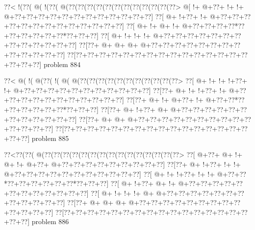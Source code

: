 \vbox{\vbox{\goo
\0??<\- !(\0??(\- @(\- !(\0??(\- @(\0??(\0??(\0??(\0??(\0??(\0??(\0??(\0??(\0??(\0??(\0??(\0??>
\- @[\- !+\- @+\0??+\- !+\- !+\- @+\0??+\0??+\0??+\0??+\0??+\0??+\0??+\0??+\0??+\0??+\0??+\0??]
\0??[\- @+\- !+\0??+\- !+\- @+\0??+\0??+\0??+\0??+\0??+\0??+\0??+\0??+\0??+\0??+\0??+\0??+\0??]
\0??[\- @+\- !+\- @+\- !+\- @+\0??+\0??+\0??+\0??*\0??+\0??+\0??+\0??+\0??+\0??*\0??+\0??+\0??]
\0??[\- @+\- !+\- !+\- !+\- @+\0??+\0??+\0??+\0??+\0??+\0??+\0??+\0??+\0??+\0??+\0??+\0??+\0??]
\0??[\0??+\- @+\- @+\- @+\- @+\0??+\0??+\0??+\0??+\0??+\0??+\0??+\0??+\0??+\0??+\0??+\0??+\0??]
\0??[\0??+\0??+\0??+\0??+\0??+\0??+\0??+\0??+\0??+\0??+\0??+\0??+\0??+\0??+\0??+\0??+\0??+\0??]
}
\hfil problem 884\hfil\break
}



\vbox{\vbox{\goo
\0??<\- @(\- !(\- @(\0??(\- !(\- @(\- @(\0??(\0??(\0??(\0??(\0??(\0??(\0??(\0??(\0??(\0??(\0??>
\0??[\- @+\- !+\- !+\- !+\0??+\- !+\- @+\0??+\0??+\0??+\0??+\0??+\0??+\0??+\0??+\0??+\0??+\0??]
\0??[\0??+\- @+\- !+\- !+\0??+\- !+\- @+\0??+\0??+\0??+\0??+\0??+\0??+\0??+\0??+\0??+\0??+\0??]
\0??[\0??+\- @+\- !+\- @+\0??+\- !+\- @+\0??+\0??*\0??+\0??+\0??+\0??+\0??+\0??*\0??+\0??+\0??]
\0??[\0??+\- @+\- !+\0??+\- @+\- @+\0??+\0??+\0??+\0??+\0??+\0??+\0??+\0??+\0??+\0??+\0??+\0??]
\0??[\0??+\- @+\- @+\- @+\0??+\0??+\0??+\0??+\0??+\0??+\0??+\0??+\0??+\0??+\0??+\0??+\0??+\0??]
\0??[\0??+\0??+\0??+\0??+\0??+\0??+\0??+\0??+\0??+\0??+\0??+\0??+\0??+\0??+\0??+\0??+\0??+\0??]
}
\hfil problem 885\hfil\break
}



\vbox{\vbox{\goo
\0??<\0??(\0??(\- @(\0??(\0??(\0??(\0??(\0??(\0??(\0??(\0??(\0??(\0??(\0??(\0??(\0??(\0??(\0??>
\0??[\- @+\0??+\- @+\- !+\- @+\- !+\- @+\0??+\- @+\0??+\0??+\0??+\0??+\0??+\0??+\0??+\0??+\0??]
\0??[\0??+\- @+\- !+\0??+\- !+\- !+\- @+\0??+\0??+\0??+\0??+\0??+\0??+\0??+\0??+\0??+\0??+\0??]
\0??[\- @+\- !+\- !+\0??+\- !+\- !+\- @+\0??+\0??*\0??+\0??+\0??+\0??+\0??+\0??*\0??+\0??+\0??]
\0??[\- @+\- !+\0??+\- @+\- !+\- @+\0??+\0??+\0??+\0??+\0??+\0??+\0??+\0??+\0??+\0??+\0??+\0??]
\0??[\- @+\- !+\- !+\- !+\- @+\- @+\0??+\0??+\0??+\0??+\0??+\0??+\0??+\0??+\0??+\0??+\0??+\0??]
\0??[\0??+\- @+\- @+\- @+\- @+\0??+\0??+\0??+\0??+\0??+\0??+\0??+\0??+\0??+\0??+\0??+\0??+\0??]
\0??[\0??+\0??+\0??+\0??+\0??+\0??+\0??+\0??+\0??+\0??+\0??+\0??+\0??+\0??+\0??+\0??+\0??+\0??]
}
\hfil problem 886\hfil\break
}



